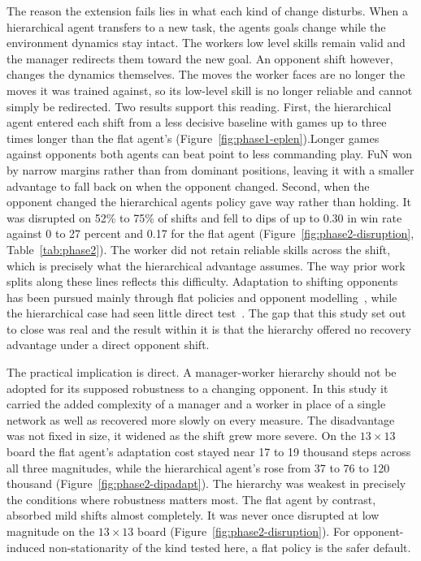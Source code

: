 \documentclass[sigconf,nonacm]{acmart}
\begin{document}
The reason the extension fails lies in what each kind of change disturbs. When a hierarchical agent transfers to a new task, the agents goals change while the environment dynamics stay intact. The workers low level skills remain valid and the manager redirects them toward the new goal. An opponent shift however, changes the dynamics themselves. The moves the worker faces are no longer the moves it was trained against, so its low-level skill is no longer reliable and cannot simply be redirected. Two results support this reading. First, the hierarchical agent entered each shift from a less decisive baseline with games up to three times longer than the flat agent's (Figure~\ref{fig:phase1-eplen}).Longer games against opponents both agents can beat point to less commanding play. FuN won by narrow margins rather than from dominant positions, leaving it with a smaller advantage to fall back on when the opponent changed. Second, when the opponent changed the hierarchical agents policy gave way rather than holding. It was disrupted on 52\% to 75\% of shifts and fell to dips of up to 0.30 in win rate against 0 to 27 percent and 0.17 for the flat agent (Figure~\ref{fig:phase2-disruption}, Table~\ref{tab:phase2}). The worker did not retain reliable skills across the shift, which is precisely what the hierarchical advantage assumes. The way prior work splits along these lines reflects this difficulty. Adaptation to shifting opponents has been pursued mainly through flat policies and opponent modelling~\cite{alshedivat2018continuous, he2016opponent}, while the hierarchical case had seen little direct test~\cite{vezhnevets2017feudal, pateria2021survey}. The gap that this study set out to close was real and the result within it is that the hierarchy offered no recovery advantage under a direct opponent shift.

\medskip

The practical implication is direct. A manager-worker hierarchy should not be adopted for its supposed robustness to a changing opponent. In this study it carried the added complexity of a manager and a worker in place of a single network as well as recovered more slowly on every measure. The disadvantage was not fixed in size, it widened as the shift grew more severe. On the $13\times13$ board the flat agent's adaptation cost stayed near 17 to 19 thousand steps across all three magnitudes, while the hierarchical agent's rose from 37 to 76 to 120 thousand (Figure~\ref{fig:phase2-dipadapt}). The hierarchy was weakest in precisely the conditions where robustness matters most. The flat agent by contrast, absorbed mild shifts almost completely. It was never once disrupted at low magnitude on the $13\times13$ board (Figure~\ref{fig:phase2-disruption}). For opponent-induced non-stationarity of the kind tested here, a flat policy is the safer default.
\end{document}
